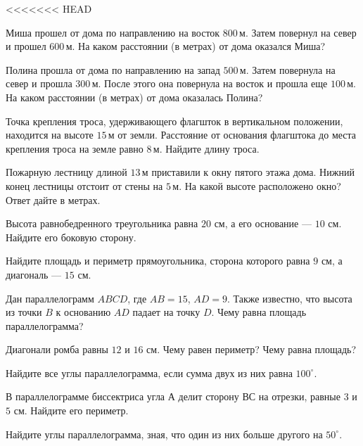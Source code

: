 <<<<<<< HEAD
\begin{class}[number=2]
	\begin{listofex}
		\item Миша прошел от дома по направлению на восток \( 800 \) м. Затем повернул на север и прошел \( 600 \) м. На каком расстоянии (в метрах) от дома оказался Миша?
		\item Полина прошла от дома по направлению на запад \( 500 \) м. Затем повернула на север и прошла \( 300 \) м. После этого она повернула на восток и прошла еще \( 100 \) м. На каком расстоянии (в метрах) от дома оказалась Полина?
		\item Точка крепления троса, удерживающего флагшток в вертикальном положении, находится на высоте \( 15 \) м от земли. Расстояние от основания флагштока до места крепления троса на земле равно \( 8 \) м. Найдите длину троса.
		\item Пожарную лестницу длиной \( 13 \) м приставили к окну пятого этажа дома. Нижний конец лестницы отстоит от стены на \( 5 \) м. На какой высоте расположено окно? Ответ дайте в метрах.
		\item Высота равнобедренного треугольника равна \( 20 \) см, а его основание --- \( 10 \) см. Найдите его боковую сторону.
		\item Найдите площадь и периметр прямоугольника, сторона которого равна \( 9 \) см, а диагональ --- \( 15 \) см.
		\item Дан параллелограмм \( ABCD \), где \( AB=15 \), \( AD=9 \). Также известно, что высота из точки \( B \) к основанию \( AD \) падает на точку \( D \). Чему равна площадь параллелограмма?
		\item Диагонали ромба равны \( 12 \) и \( 16 \) см. Чему равен периметр? Чему равна площадь? 
		\item Найдите все углы параллелограмма, если сумма двух из них равна \( 100^{\circ}\).
		\item В параллелограмме биссектриса угла \( А \) делит сторону \( ВС  \) на отрезки, равные \( 3 \) и \( 5  \) см. Найдите его периметр.
		\item Найдите углы параллелограмма, зная, что один из них больше другого на \( 50^{\circ} \).
	\end{listofex}
\end{class}

